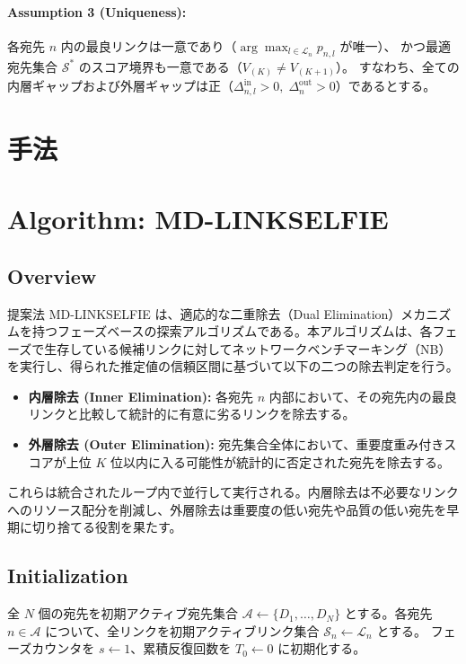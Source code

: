 \documentclass[conference]{IEEEtran}
\begin{document}
\paragraph{Assumption 3 (Uniqueness):}
各宛先 $n$ 内の最良リンクは一意であり（$\arg\max_{l \in \mathcal{L}_n} p_{n,l}$ が唯一）、
かつ最適宛先集合 $\mathcal{S}^*$ のスコア境界も一意である（$V_{(K)} \neq V_{(K+1)}$）。
すなわち、全ての内層ギャップおよび外層ギャップは正（$\Delta_{n,l}^{\mathrm{in}} > 0,\; \Delta_n^{\mathrm{out}} > 0$）であるとする。



\section*{手法}
\label{sec:orgb721526}

\section{Algorithm: MD-LINKSELFIE}

\subsection{Overview}

提案法 MD-LINKSELFIE は、適応的な二重除去（Dual Elimination）メカニズムを持つフェーズベースの探索アルゴリズムである。本アルゴリズムは、各フェーズで生存している候補リンクに対してネットワークベンチマーキング（NB）を実行し、得られた推定値の信頼区間に基づいて以下の二つの除去判定を行う。

\begin{itemize}
    \item \textbf{内層除去 (Inner Elimination):} 各宛先 $n$ 内部において、その宛先内の最良リンクと比較して統計的に有意に劣るリンクを除去する。
    \item \textbf{外層除去 (Outer Elimination):} 宛先集合全体において、重要度重み付きスコアが上位 $K$ 位以内に入る可能性が統計的に否定された宛先を除去する。
\end{itemize}

これらは統合されたループ内で並行して実行される。内層除去は不必要なリンクへのリソース配分を削減し、外層除去は重要度の低い宛先や品質の低い宛先を早期に切り捨てる役割を果たす。

\subsection{Initialization}

全 $N$ 個の宛先を初期アクティブ宛先集合 $\mathcal{A} \leftarrow \{D_1, \dots, D_N\}$ とする。各宛先 $n \in \mathcal{A}$ について、全リンクを初期アクティブリンク集合 $\mathcal{S}_n \leftarrow \mathcal{L}_n$ とする。
フェーズカウンタを $s \leftarrow 1$、累積反復回数を $T_0 \leftarrow 0$ に初期化する。
\end{document}

